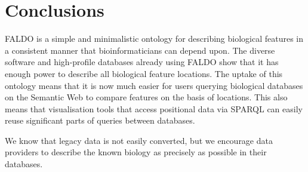 \section*{Conclusions}
FALDO is a simple and minimalistic ontology for describing biological features in a consistent manner that bioinformaticians can depend upon.
The diverse software and high-profile databases already using FALDO show that it has enough power to describe all biological feature locations.
The uptake of this ontology means that it is now much easier for users querying biological databases on the Semantic Web to compare features on the basis of locations.
This also means that visualisation tools that access positional data via SPARQL can easily reuse significant parts of queries between databases.

We know that legacy data is not easily converted, but we encourage data providers to describe the known biology as precisely as possible in their databases.
